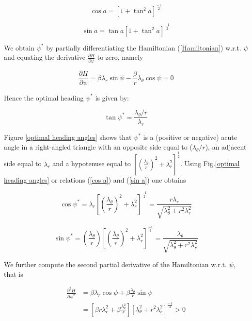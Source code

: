 \begin{equation}
	\cos a = [1+ \tan^2 a ]^{\frac{-1}{2}}
	\label{cos a}
\end{equation}

\begin{equation}
\sin a =\tan a [1+ \tan^2 a ]^{\frac{-1}{2}}
\label{sin a}
\end{equation}

We obtain $\psi^*$ by partially differentiating the Hamiltonian (\ref{Hamiltonian}) w.r.t. $\psi$ and equating the derivative $\frac{\partial H}{\partial \psi}$ to zero, namely 

\begin{equation}
	\frac{\partial H}{\partial \psi} = \beta \lambda_r \sin \psi - \frac{\beta}{r} \lambda_\theta \cos \psi = 0 
\label{PD H wrt psi}
\end{equation}

Hence the optimal heading $\psi^*$ is given by:

\begin{equation}
	\tan \psi^* = \dfrac{\lambda_\theta / r}{\lambda_r}
\label{tan psi}
 \end{equation}
 
 Figure \ref{optimal heading angles} shows that $\psi^*$ is a (positive or negative) acute angle in a right-angled triangle with an opposite side equal to ($\lambda_\theta / r$), an adjacent side equal to $\lambda_r$ and a hypotenuse equal to $[(\frac{\lambda_\theta}{r})^2 + \lambda_r^2]^\frac{1}{2}$. Using Fig.\ref{optimal heading angles} or relations (\ref{cos a}) and (\ref{sin a}) one obtains 
 
\begin{equation}
 	\cos \psi^* = \lambda_r [(\frac{\lambda_\theta}{r})^2 + \lambda_r^2]^\frac{-1}{2} 
 	= \dfrac{r \lambda_r}{\sqrt{\lambda_\theta ^2 + r^2 \lambda_r ^2}}
\label{cos psi}
\end{equation}

\begin{equation}
\sin \psi^* = (\frac{\lambda_\theta}{r}) [(\frac{\lambda_\theta}{r})^2 + \lambda_r^2]^\frac{-1}{2} 
= \dfrac{\lambda_\theta}{\sqrt{\lambda_\theta ^2 + r^2 \lambda_r ^2}}
\label{sin psi}
\end{equation}

We further compute the second partial derivative of the Hamiltonian w.r.t. $\psi$, that is 

\begin{equation}
\begin{split}
\frac{\partial^2 H}{\partial \psi^2}& = \beta \lambda_r \cos \psi + \beta \frac{\lambda_\theta }{r} \sin \psi \\
&= [\beta r \lambda^2 _ r + \beta \frac{\lambda^2 _ \theta}{r}][\lambda^2_\theta + r^2 \lambda^2_r]^\frac{-1}{2} > 0
\end{split}
\end{equation}

